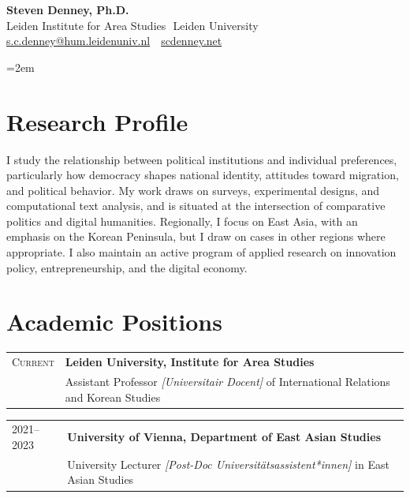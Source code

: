 \documentclass[11pt, a4paper]{article}
\makeatletter
\newcommand{\cventry}[3]{%
  \noindent
  \begin{tabularx}{\textwidth}{@{}p{2.4cm}X@{}}
    \textsc{#1} & \textbf{#2} \\
                 & #3
  \end{tabularx}\vspace{0.15em}%
}
\makeatother
\begin{document}
\begin{center}
  {\LARGE\sffamily\bfseries Steven Denney, Ph.D.}\\[0.3em]
  {\normalsize
    Leiden Institute for Area Studies\,\textperiodcentered\, Leiden University\\[0.1em]
    \href{mailto:s.c.denney@hum.leidenuniv.nl}{s.c.denney@hum.leidenuniv.nl}
    \,\textperiodcentered\,
    \href{https://scdenney.net}{scdenney.net}
  }
\end{center}

\vspace{0.15em}

\begingroup
{}
\emergencystretch=2em

\section{Research Profile}

I study the relationship between political institutions and individual preferences, particularly how democracy shapes national identity, attitudes toward migration, and political behavior. My work draws on surveys, experimental designs, and computational text analysis, and is situated at the intersection of comparative politics and digital humanities. Regionally, I focus on East Asia, with an emphasis on the Korean Peninsula, but I draw on cases in other regions where appropriate. I also maintain an active program of applied research on innovation policy, entrepreneurship, and the digital economy.

\vfill

\section{Academic Positions}

\cventry{Current}{Leiden University, Institute for Area Studies}
  {Assistant Professor \textit{[Universitair Docent]} of International Relations and Korean Studies}

\cventry{2021--2023}{University of Vienna, Department of East Asian Studies}
  {University Lecturer \textit{[Post-Doc Universitätsassistent*innen]} in East Asian Studies}
\end{document}
